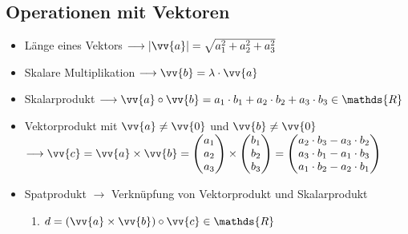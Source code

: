 \documentclass[a4paper,twocolumn,10pt]{onepgnote1}
\begin{document}
\subsection{Operationen mit Vektoren}
\begin{itemize}
\item Länge eines Vektors $\longrightarrow |\vv{a}| = \sqrt{a_1^2 + a_2^2 + a_3^2}$
\item Skalare Multiplikation $\longrightarrow \vv{b} = \lambda \cdot \vv{a} $
\item Skalarprodukt $\longrightarrow \vv{a}\circ \vv{b} = a_1\cdot b_1 + a_2\cdot b_2 + a_3\cdot b_3 \in \mathds{R}$
\item Vektorprodukt mit $\vv{a} \neq \vv{0}$ und $\vv{b} \neq \vv{0}$ \\$\longrightarrow\vv{c} = \vv{a} \times \vv{b} = \begin{pmatrix} a_1 \\a_2\\a_3\end{pmatrix} \times \begin{pmatrix} b_1 \\b_2\\b_3\end{pmatrix} = \begin{pmatrix} a_2\cdot b_3 - a_3\cdot b_2 \\a_3\cdot b_1 - a_1\cdot b_3\\a_1\cdot b_2 - a_2\cdot b_1\end{pmatrix}$
\item Spatprodukt $\longrightarrow$ Verknüpfung von Vektorprodukt und Skalarprodukt\\
\begin{enumerate}
    \item $d = \left(\vv{a} \times\vv{b}\right) \circ\vv{c} \in \mathds{R}$
\end{enumerate}
\end{itemize}
\end{document}
